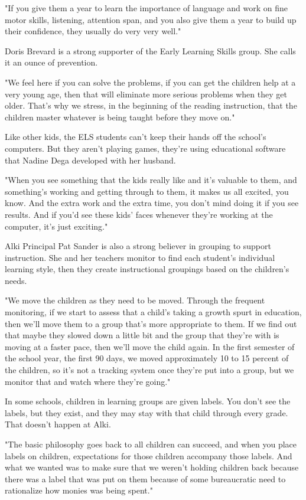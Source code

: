 "If you give them a year to learn the importance of language and work on fine motor skills, listening, attention span, and you also give them a year to build up their confidence, they usually do very very well."

Doris Brevard is a strong supporter of the Early Learning Skills group. She calls it an ounce of prevention.

"We feel here if you can solve the problems, if you can get the children help at a very young age, then that will eliminate more serious problems when they get older. That's why we stress, in the beginning of the reading instruction, that the children master whatever is being taught before they move on."

Like other kids, the ELS students can't keep their hands off the school's computers. But they aren't playing games, they're using educational software that Nadine Dega developed with her husband.

"When you see something that the kids really like and it's valuable to them, and something's working and getting through to them, it makes us all excited, you know. And the extra work and the extra time, you don't mind doing it if you see results. And if you'd see these kids' faces whenever they're working at the computer, it's just exciting."

Alki Principal Pat Sander is also a strong believer in grouping to support instruction. She and her teachers monitor to find each student's individual learning style, then they create instructional groupings based on the children's needs.

"We move the children as they need to be moved. Through the frequent monitoring, if we start to assess that a child's taking a growth spurt in education, then we'll move them to a group that's more appropriate to them. If we find out that maybe they slowed down a little bit and the group that they're with is moving at a faster pace, then we'll move the child again. In the first semester of the school year, the first 90 days, we moved approximately 10 to 15 percent of the children, so it's not a tracking system once they're put into a group, but we monitor that and watch where they're going."

In some schools, children in learning groups are given labels. You don't see the labels, but they exist, and they may stay with that child through every grade. That doesn't happen at Alki.

"The basic philosophy goes back to all children can succeed, and when you place labels on children, expectations for those children accompany those labels. And what we wanted was to make sure that we weren't holding children back because there was a label that was put on them because of some bureaucratic need to rationalize how monies was being spent."

